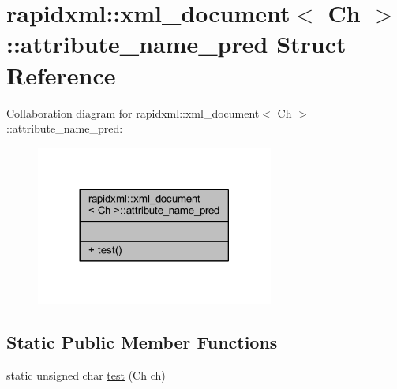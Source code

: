 \hypertarget{structrapidxml_1_1xml__document_1_1attribute__name__pred}{\section{rapidxml\+:\+:xml\+\_\+document$<$ Ch $>$\+:\+:attribute\+\_\+name\+\_\+pred Struct Reference}
\label{structrapidxml_1_1xml__document_1_1attribute__name__pred}
}


Collaboration diagram for rapidxml\+:\+:xml\+\_\+document$<$ Ch $>$\+:\+:attribute\+\_\+name\+\_\+pred\+:\nopagebreak
\begin{figure}[H]
\begin{center}
\leavevmode
\includegraphics[width=221pt]{structrapidxml_1_1xml__document_1_1attribute__name__pred__coll__graph}
\end{center}
\end{figure}
\subsection*{Static Public Member Functions}
\begin{DoxyCompactItemize}
\item 
static unsigned char \hyperlink{structrapidxml_1_1xml__document_1_1attribute__name__pred_a2cf003483847dfabcf0c83877818a4c5}{test} (Ch ch)
\end{DoxyCompactItemize}


